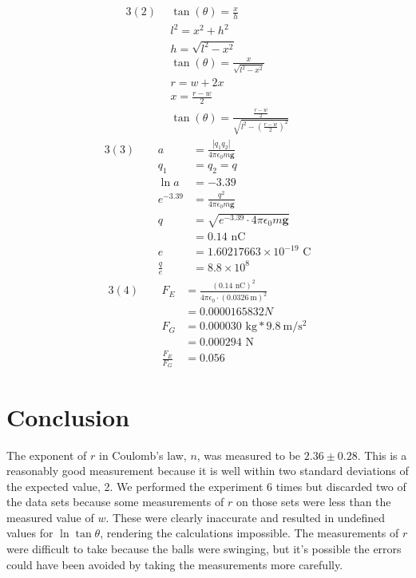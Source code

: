 \documentclass[12pt]{article}
\begin{document}
        \begin{alignat*}{3}
            (2)\ \ 
            &\tan(\theta) = \frac{x}{h}\\
            & l^2 = x^2 + h^2\\
            & h = \sqrt{l^2-x^2}\\
            &\tan(\theta)= \frac{x}{\sqrt{l^2-x^2}}\\
            &r = w+2x\\
            &x = \frac{r-w}{2}\\
            &\tan(\theta) = \frac{\frac{r-w}{2}}{\sqrt{l^2 - (\frac{r-w}{2})^2}}
        \end{alignat*}
        \begin{alignat*}{3}
            (3)~~
            &&a &=\frac{|q_1q_2|}{4\pi \epsilon_0 m\mathbf{g}}\\
            && q_1 &= q_2 = q\\
            &&\ln a &= -3.39\\
            && e^{-3.39} &= \frac{q^2}{4\pi \epsilon_0 m\mathbf{g}}\\
            && q &= \sqrt{e^{-3.39}\cdot4 \pi \epsilon_0 m\mathbf{g}}\\
            &&& = 0.14 \text{ nC}\\
            &&e &= 1.60217663\times 10^{-19} \text{ C}\\
            &&\frac{q}{e} &=8.8 \times 10^8
        \end{alignat*}
        \begin{alignat*}{3}
            (4)~~
            &&F_E &= \frac{(0.14 \text{ nC})^2}{4\pi\epsilon_0 \cdot (0.0326\ \text{m})^2}\\
            &&&= 0.0000165832 N\\
            &&F_G &= 0.000030 \text{ kg} * 9.8\ \mathrm{m/s^2}\\
            &&& = 0.000294\text{ N}\\
            &&\frac{F_E}{F_G} &= 0.056
        \end{alignat*}
    \section{Conclusion}
        The exponent of \(r\) in Coulomb's law, \(n\), was measured to be \(2.36 \pm 0.28\). This is a reasonably good measurement because it is well within two standard deviations of the expected value, 2. We performed the experiment 6 times but discarded two of the data sets because some measurements of \(r\) on those sets were less than the measured value of \(w\). These were clearly inaccurate and resulted in undefined values for \(\ln\tan\theta\), rendering the calculations impossible. The measurements of \(r\) were difficult to take because the balls were swinging, but it's possible the errors could have been avoided by taking the measurements more carefully.
\end{document}
